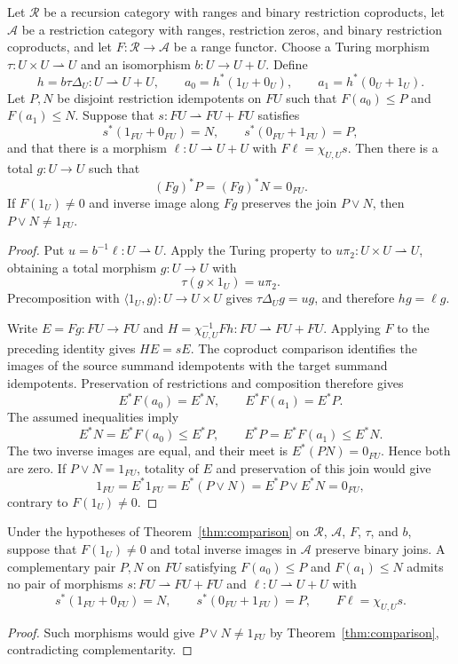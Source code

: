 \begin{theorem}\label{thm:comparison}
Let $\mathscr R$ be a recursion category with ranges and binary
restriction coproducts, let $\mathcal A$ be a restriction category with
ranges, restriction zeros, and binary restriction coproducts, and let
$F:\mathscr R\to\mathcal A$ be a range functor.
Choose a Turing morphism $\tau:U\times U\rightharpoonup U$ and an
isomorphism $b:U\to U+U$. Define
\[
 h=b\tau\Delta_U:U\rightharpoonup U+U,\qquad
 a_0=h^*(1_U+0_U),\qquad a_1=h^*(0_U+1_U).
\]
Let $P,N$ be disjoint restriction idempotents on $FU$ such that
$F(a_0)\le P$ and $F(a_1)\le N$. Suppose that
$s:FU\rightharpoonup FU+FU$ satisfies
\[
 s^*(1_{FU}+0_{FU})=N,\qquad
 s^*(0_{FU}+1_{FU})=P,
\]
and that there is a morphism $\ell:U\rightharpoonup U+U$ with
$F\ell=\chi_{U,U}s$.
Then there is a total $g:U\to U$ such that
\[
 (Fg)^*P=(Fg)^*N=0_{FU}.
\]
If $F(1_U)\ne0$ and inverse image along $Fg$ preserves the join
$P\vee N$, then $P\vee N\ne1_{FU}$.
\end{theorem}
\begin{proof}
Put $u=b^{-1}\ell:U\rightharpoonup U$. Apply the Turing property
to $u\pi_2:U\times U\rightharpoonup U$, obtaining a total morphism
$g:U\to U$ with
\[
 \tau(g\times1_U)=u\pi_2.
\]
Precomposition with $\langle1_U,g\rangle:U\to U\times U$ gives
$\tau\Delta_Ug=ug$, and therefore $hg=\ell g$.

Write
$E=Fg:FU\to FU$ and
$H=\chi_{U,U}^{-1}Fh:FU\rightharpoonup FU+FU$.
Applying $F$ to the preceding identity gives $HE=sE$.
The coproduct comparison identifies the images of the source summand
idempotents with the target summand idempotents. Preservation of
restrictions and composition therefore gives
\[
 E^*F(a_0)=E^*N,\qquad E^*F(a_1)=E^*P.
\]
The assumed inequalities imply
\[
 E^*N=E^*F(a_0)\le E^*P,\qquad
 E^*P=E^*F(a_1)\le E^*N.
\]
The two inverse images are equal, and their meet is
$E^*(PN)=0_{FU}$. Hence both are zero.
If $P\vee N=1_{FU}$, totality of $E$ and preservation of this join
would give
\[
 1_{FU}=E^*1_{FU}=E^*(P\vee N)
       =E^*P\vee E^*N=0_{FU},
\]
contrary to $F(1_U)\ne0$.
\end{proof}

\begin{corollary}\label{cor:separator}
Under the hypotheses of Theorem~\ref{thm:comparison} on
$\mathscr R$, $\mathcal A$, $F$, $\tau$, and $b$, suppose that
$F(1_U)\ne0$ and total inverse images in $\mathcal A$ preserve
binary joins. A complementary pair $P,N$ on $FU$ satisfying
$F(a_0)\le P$ and $F(a_1)\le N$ admits no pair of morphisms
$s:FU\rightharpoonup FU+FU$ and
$\ell:U\rightharpoonup U+U$ with
\[
 s^*(1_{FU}+0_{FU})=N,\qquad
 s^*(0_{FU}+1_{FU})=P,\qquad
 F\ell=\chi_{U,U}s.
\]
\end{corollary}
\begin{proof}
Such morphisms would give $P\vee N\ne1_{FU}$ by
Theorem~\ref{thm:comparison}, contradicting complementarity.
\end{proof}


